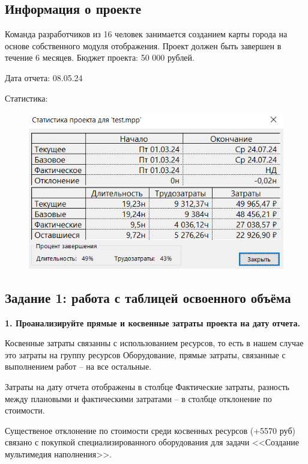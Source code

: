 \subsection*{Информация о проекте}

Команда разработчиков из 16 человек занимается созданием карты города на
основе собственного модуля отображения. Проект должен быть завершен в
течение 6 месяцев. Бюджет проекта: 50 000 рублей.

Дата отчета: 08.05.24

Статистика:

\begin{figure}[h!]
	\begin{center}
		\includegraphics[scale=0.7]{inc/img/p_1.png}
	\end{center}
	\captionsetup{justification=centering}
	\label{fig:u3}
\end{figure}

\subsection*{Задание 1: работа с таблицей освоенного объёма}

\textbf{1. Проанализируйте прямые и косвенные затраты проекта на дату отчета.}

Косвенные затраты связанны с использованием ресурсов, то есть в нашем
случае это затраты на группу ресурсов Оборудование, прямые затраты,
связанные с выполнением работ – на все остальные.

Затраты на дату отчета отображены в столбце Фактические затраты, разность
между плановыми и фактическими затратами – в столбце отклонение по
стоимости.

Существеное отклонение по стоимости среди косвенных ресурсов (+5570 руб) связано с покупкой специализированного оборудования для задачи <<Создание мультимедия наполнения>>. 


